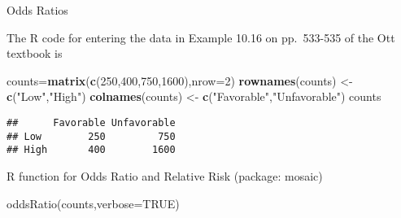 \documentclass[12pt,ignorenonframetext,aspectratio=169]{beamer}
\newenvironment{Shaded}{\begin{snugshade}}{\end{snugshade}}
\newcommand{\KeywordTok}[1]{\textcolor[rgb]{0.13,0.29,0.53}{\textbf{{#1}}}}
\newcommand{\DataTypeTok}[1]{\textcolor[rgb]{0.13,0.29,0.53}{{#1}}}
\newcommand{\DecValTok}[1]{\textcolor[rgb]{0.00,0.00,0.81}{{#1}}}
\newcommand{\StringTok}[1]{\textcolor[rgb]{0.31,0.60,0.02}{{#1}}}
\newcommand{\NormalTok}[1]{{#1}}
\begin{document}
\begin{frame}[fragile]{Odds Ratios}

The R code for entering the data in Example 10.16 on pp.~533-535 of the
Ott textbook is

\begin{Shaded}
\begin{Highlighting}[]
\NormalTok{counts=}\KeywordTok{matrix}\NormalTok{(}\KeywordTok{c}\NormalTok{(}\DecValTok{250}\NormalTok{,}\DecValTok{400}\NormalTok{,}\DecValTok{750}\NormalTok{,}\DecValTok{1600}\NormalTok{),}\DataTypeTok{nrow=}\DecValTok{2}\NormalTok{)}
\KeywordTok{rownames}\NormalTok{(counts) <-}\StringTok{ }\KeywordTok{c}\NormalTok{(}\StringTok{"Low"}\NormalTok{,}\StringTok{"High"}\NormalTok{)}
\KeywordTok{colnames}\NormalTok{(counts) <-}\StringTok{ }\KeywordTok{c}\NormalTok{(}\StringTok{"Favorable"}\NormalTok{,}\StringTok{"Unfavorable"}\NormalTok{)}
\NormalTok{counts}
\end{Highlighting}
\end{Shaded}

\begin{verbatim}
##      Favorable Unfavorable
## Low        250         750
## High       400        1600
\end{verbatim}

\note{}

\end{frame}

\begin{frame}{R function for Odds Ratio and Relative Risk (package:
mosaic)}

oddsRatio(counts,verbose=TRUE)


\end{frame}
\end{document}
